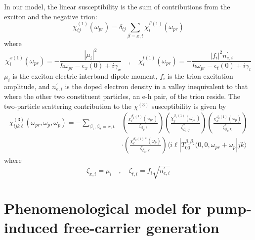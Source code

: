 \documentclass[aps,prb,superscriptaddress,letterpaper,amsmath,amssymb,twocolumn,preprintnumbers]{revtex4}
\begin{document}
\begin{widetext}
In our model, the linear susceptibility is the sum of contributions from the exciton and the negative trion:
\begin{equation}\label{chi-1-susc.equ}
\chi^{(1)}_{i j} (\omega_{pr}) = \delta_{i j} \sum_{\beta = x,t} \chi^{\beta (1)}_{i} (\omega_{pr})
\end{equation}
where
\begin{equation}
\label{chi-1-xt.equ}
\chi^{x (1)}_{i} (\omega_{pr}) = - \frac {|\mu_i|^2} {\hbar \omega_{pr} - \epsilon_x (0) +i \gamma_x} \quad , \quad \chi^{t (1)}_{i} (\omega_{pr}) = - \frac {|f_i|^2 n^{\prime}_{e,i}} {\hbar \omega_{pr} - \epsilon_t (0) +i \gamma_t}
\end{equation}
$\mu_i$ is the exciton electric interband dipole moment, $f_i$ is the trion excitation amplitude, and $n^{\prime}_{e,i}$ is the doped electron density in a valley inequivalent to that where the other two constituent particles, an e-h pair, of the trion reside. The two-particle scattering contribution to the $\chi^{(3)}$ susceptibility is given by
\begin{align}\label{chi-3-susc.equ}
\chi^{(3)}_{i j k \ell} (\omega_{pr},\omega_{p},\omega_{p}) = - \sum_{\beta_1 , \beta_2 = x,t}
&\left( \frac {\chi^{\beta_1 (1)}_{i} (\omega_{pr})} {\zeta_{\beta_1,i}} \right)
\left( \frac {\chi^{\beta_1 (1)}_{j} (\omega_{pr})} {\zeta^{\ast}_{\beta_1,j}} \right)
\left( \frac {\chi^{\beta_2 (1)}_{k} (\omega_{p})} {\zeta^{\ast}_{\beta_2,k}} \right) \\
&\cdot \left( \frac {\chi^{\beta_2 (1) \ast}_{\ell} (\omega_{p})} {\zeta_{\beta_2,\ell}} \right)
\langle i \ell | T^{\beta_1 \beta_2}_{0 0} (0 , 0 , \omega_{pr}+\omega_{p} | j k \rangle \nonumber
\end{align}
where
\begin{equation}\label{zeta-def.equ}
\zeta_{x,i} = \mu_i \quad , \quad \zeta_{t,i} = f_i \sqrt{n^{\prime}_{e,i}}
\end{equation}
\end{widetext}


















\section{Phenomenological model for pump-induced free-carrier generation}
\end{document}
